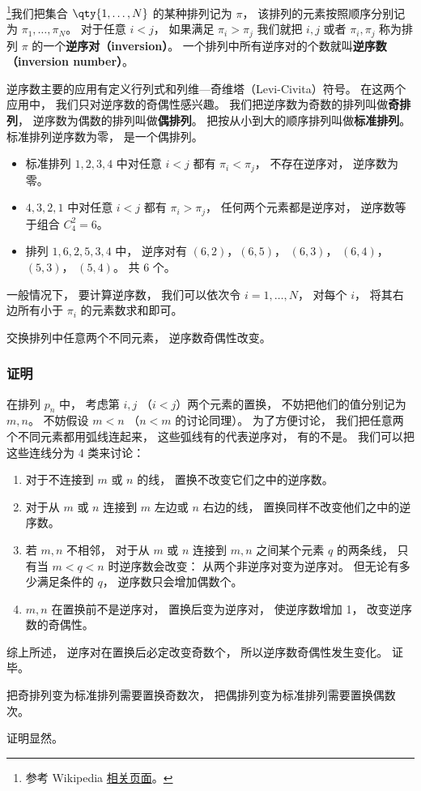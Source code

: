 

\footnote{参考 Wikipedia \href{https://en.wikipedia.org/wiki/Inversion_(discrete_mathematics)}{相关页面}。}我们把集合 $\qty{1,\dots,N}$ 的某种排列记为 $\pi$， 该排列的元素按照顺序分别记为 $\pi_1, \dots, \pi_N$。 对于任意 $i < j$， 如果满足 $\pi_i > \pi_j$ 我们就把 $i, j$ 或者 $\pi_i, \pi_j$ 称为排列 $\pi$ 的一个\textbf{逆序对（inversion）}。 一个排列中所有逆序对的个数就叫\textbf{逆序数（inversion number）}。

逆序数主要的应用有定义行列式和列维—奇维塔（Levi-Civita）符号。 在这两个应用中， 我们只对逆序数的奇偶性感兴趣。 我们把逆序数为奇数的排列叫做\textbf{奇排列}， 逆序数为偶数的排列叫做\textbf{偶排列}。 把按从小到大的顺序排列叫做\textbf{标准排列}。 标准排列逆序数为零， 是一个偶排列。

\begin{example}{}
\begin{itemize}
\item 标准排列 $1,2,3,4$ 中对任意 $i < j$ 都有 $\pi_i < \pi_j$， 不存在逆序对， 逆序数为零。
\item $4,3,2,1$ 中对任意 $i < j$ 都有 $\pi_i > \pi_j$， 任何两个元素都是逆序对， 逆序数等于组合 $C_4^2 = 6$。
\item 排列 $1,6,2,5,3,4$ 中， 逆序对有 $(6,2)$，$(6,5)$， $(6,3)$， $(6,4)$，$(5,3)$， $(5,4)$。 共 $6$ 个。
\end{itemize}
\end{example}
一般情况下， 要计算逆序数， 我们可以依次令 $i = 1, \dots, N$， 对每个 $i$， 将其右边所有小于 $\pi_i$ 的元素数求和即可。

\begin{theorem}{}
交换排列中任意两个不同元素， 逆序数奇偶性改变。 
\end{theorem}

\subsubsection{证明}
在排列 $p_n$ 中， 考虑第 $i, j$ （$i < j$）两个元素的置换， 不妨把他们的值分别记为 $m, n$。 不妨假设 $m < n$ （$n < m$ 的讨论同理）。 为了方便讨论， 我们把任意两个不同元素都用弧线连起来， 这些弧线有的代表逆序对， 有的不是。 我们可以把这些连线分为 4 类来讨论：
\begin{enumerate}
\item 对于不连接到 $m$ 或 $n$ 的线， 置换不改变它们之中的逆序数。
\item 对于从 $m$ 或 $n$ 连接到 $m$ 左边或 $n$ 右边的线， 置换同样不改变他们之中的逆序数。
\item 若 $m,n$ 不相邻， 对于从 $m$ 或 $n$ 连接到 $m, n$ 之间某个元素 $q$ 的两条线， 只有当 $m < q < n$ 时逆序数会改变： 从两个非逆序对变为逆序对。 但无论有多少满足条件的 $q$， 逆序数只会增加偶数个。
\item $m,n$ 在置换前不是逆序对， 置换后变为逆序对， 使逆序数增加 1， 改变逆序数的奇偶性。
\end{enumerate}
综上所述， 逆序对在置换后必定改变奇数个， 所以逆序数奇偶性发生变化。 证毕。

\begin{corollary}{}
把奇排列变为标准排列需要置换奇数次， 把偶排列变为标准排列需要置换偶数次。
\end{corollary}
证明显然。
